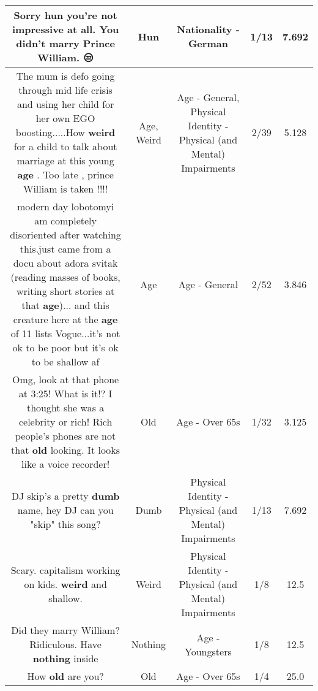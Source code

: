 \documentclass[11pt]{article}
\newlength\mylength
\begin{document}
\begin{center}
\begin{longtable}{|C{.65\mylength}|C{.30\mylength}|C{.12\mylength}|C{.12\mylength}|C{.12\mylength}|}
  \small Sorry \textbf{hun} you're not impressive at all. You didn't marry Prince William. 😒\normalsize   & Hun & Nationality - German & 1/13 & 7.692 \\  \hline
  \small The mum is defo going through mid life crisis and using her child for her own EGO boosting.....How \textbf{weird} for a child to talk about marriage at this young \textbf{age} . Too late , prince William is taken !!!!\normalsize   & Age, Weird & Age - General, Physical Identity - Physical (and Mental) Impairments & 2/39 & 5.128 \\  \hline
  \small modern day lobotomyi am completely disoriented after watching this.just came from a docu about adora svitak (reading masses of books, writing short stories at that \textbf{age})... and this creature here at the \textbf{age} of 11 lists Vogue...it's not ok to be poor but it's ok to be shallow af\normalsize   & Age & Age - General & 2/52 & 3.846 \\  \hline
  \small Omg, look at that phone at 3:25! What is it!? I thought she was a celebrity or rich! Rich people's phones are not that \textbf{old} looking. It looks like a voice recorder!\normalsize   & Old & Age - Over 65s & 1/32 & 3.125 \\  \hline
  \small DJ skip's a pretty \textbf{dumb} name, hey DJ can you "skip" this song?\normalsize   & Dumb & Physical Identity - Physical (and Mental) Impairments & 1/13 & 7.692 \\  \hline
  \small Scary. capitalism working on kids. \textbf{weird} and shallow.\normalsize   & Weird & Physical Identity - Physical (and Mental) Impairments & 1/8 & 12.5 \\  \hline
  \small Did they marry William? Ridiculous. Have \textbf{nothing} inside\normalsize   & Nothing & Age - Youngsters & 1/8 & 12.5 \\  \hline
  \small How \textbf{old} are you?\normalsize   & Old & Age - Over 65s & 1/4 & 25.0 \\  \hline

\end{longtable}
\end{center}
\end{document}
